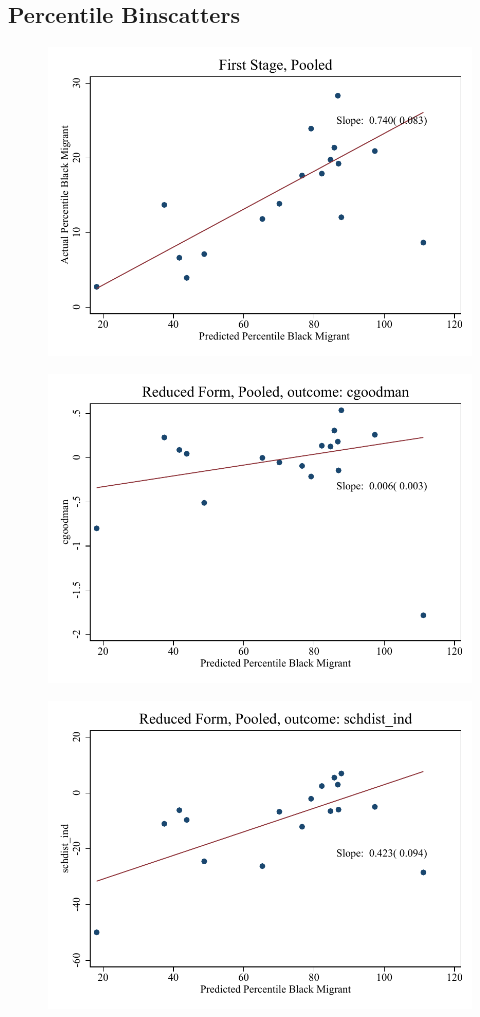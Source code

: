 \documentclass{article}
\begin{document}
\subsection{Percentile Binscatters}
\clearpage
\begin{figure}
	\centering
	\includegraphics[width=.8\textwidth]{figures/binscatter/pooled_fs_percentile.pdf}
\end{figure}
\clearpage
\begin{figure}
	\centering
	\includegraphics[width=.8\textwidth]{figures/binscatter/pooled_cgoodman_rf_percentile.pdf}
\end{figure}
\clearpage
\begin{figure}
	\centering
	\includegraphics[width=.8\textwidth]{figures/binscatter/pooled_schdist_ind_rf_percentile.pdf}
\end{figure}
\end{document}
